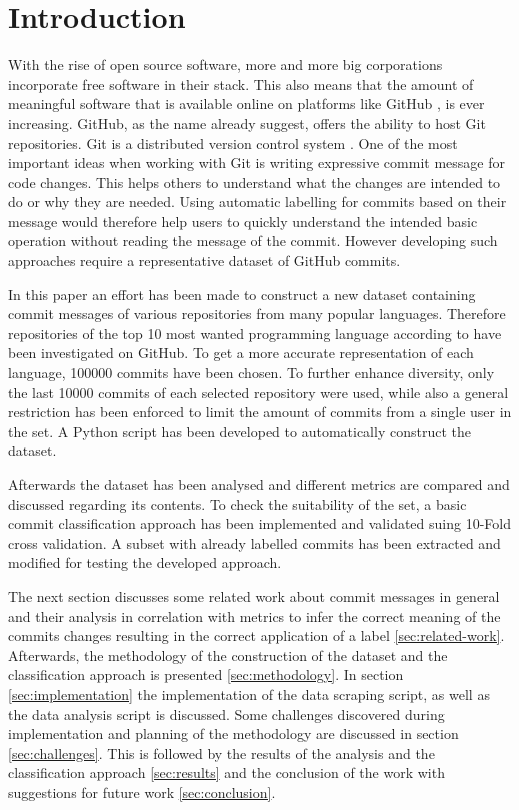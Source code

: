 \section{Introduction}
\label{sec:introduction}

With the rise of open source software, more and more big corporations
incorporate free software in their stack. This also means that the amount of
meaningful software that is available online on platforms like GitHub
\cite{github}, is ever increasing. GitHub, as the name already suggest, offers
the ability to host Git repositories. Git is a distributed version control
system \cite{git}. One of the most important ideas when working with Git
is writing expressive commit message for code changes. This helps others
to understand what the changes are intended to do or why they are needed.
Using automatic labelling for commits based on their message would therefore
help users to quickly understand the intended basic operation without reading
the message of the commit. However developing such approaches require a
representative dataset of GitHub commits.

In this paper an effort has been made to construct a new dataset containing
commit messages of various repositories from many popular languages. Therefore
repositories of the top 10 most wanted programming language according to
\cite{so-survey} have been investigated on GitHub. To get a more accurate
representation of each language, 100000 commits have been chosen. To further
enhance diversity, only the last 10000 commits of each selected repository
were used, while also a general restriction has been enforced to limit the
amount of commits from a single user in the set. A Python script has been
developed to automatically construct the dataset.

Afterwards the dataset has been analysed and different metrics are
compared and discussed regarding its contents. To check the
suitability of the set, a basic commit classification approach has been
implemented and validated suing 10-Fold cross validation. A subset with
already labelled commits has been extracted and modified for testing the
developed approach.

The next section discusses some related work about commit messages in
general and their analysis in correlation with metrics to infer the
correct meaning of the commits changes resulting in the correct application
of a label \ref{sec:related-work}. Afterwards, the methodology of the
construction of the dataset and the classification approach is presented
\ref{sec:methodology}. In section \ref{sec:implementation} the
implementation of the data scraping script, as well as the data analysis
script is discussed. Some challenges discovered during implementation and
planning of the methodology are discussed in section \ref{sec:challenges}.
This is followed by the results of the analysis and
the classification approach \ref{sec:results} and the conclusion of the
work with suggestions for future work \ref{sec:conclusion}.
